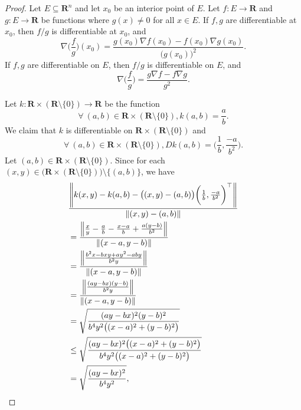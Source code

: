 \begin{proof}
    Let \(E \subseteq \mathbf{R}^n\) and let \(x_0\) be an interior point of \(E\).
    Let \(f : E \to \mathbf{R}\) and \(g : E \to \mathbf{R}\) be functions where \(g(x) \neq 0\) for all \(x \in E\).
    If \(f, g\) are differentiable at \(x_0\), then \(f / g\) is differentiable at \(x_0\), and
    \[
        \nabla \bigg(\frac{f}{g}\bigg)(x_0) = \frac{g(x_0) \nabla f(x_0) - f(x_0) \nabla g(x_0)}{\big(g(x_0)\big)^2}.
    \]
    If \(f, g\) are differentiable on \(E\), then \(f / g\) is differentiable on \(E\), and
    \[
        \nabla \bigg(\frac{f}{g}\bigg) = \frac{g \nabla f - f \nabla g}{g^2}.
    \]

    Let \(k : \mathbf{R} \times (\mathbf{R} \setminus \{0\}) \to \mathbf{R}\) be the function
    \[
        \forall\ (a, b) \in \mathbf{R} \times (\mathbf{R} \setminus \{0\}), k(a, b) = \frac{a}{b}.
    \]
    We claim that \(k\) is differentiable on \(\mathbf{R} \times (\mathbf{R} \setminus \{0\})\) and
    \[
        \forall\ (a, b) \in \mathbf{R} \times (\mathbf{R} \setminus \{0\}), D k(a, b) = \bigg(\frac{1}{b}, \frac{-a}{b^2}\bigg).
    \]
    Let \((a, b) \in \mathbf{R} \times (\mathbf{R} \setminus \{0\})\).
    Since for each \((x, y) \in \big(\mathbf{R} \times (\mathbf{R} \setminus \{0\})\big) \setminus \{(a, b)\}\), we have
    \begin{align*}
         & \frac{\norm*{k(x, y) - k(a, b) - \big((x, y) - (a, b)\big) \bigg(\frac{1}{b}, \frac{-a}{b^2}\bigg)^\top}}{\norm*{(x, y) - (a, b)}} \\
         & = \frac{\norm*{\frac{x}{y} - \frac{a}{b} - \frac{x - a}{b} + \frac{a(y - b)}{b^2}}}{\norm*{(x - a, y - b)}}                        \\
         & = \frac{\norm*{\frac{b^2 x - bxy + ay^2 - aby}{b^2y}}}{\norm*{(x - a, y - b)}}                                                     \\
         & = \frac{\norm*{\frac{(ay - bx)(y - b)}{b^2y}}}{\norm*{(x - a, y - b)}}                                                             \\
         & = \sqrt{\frac{(ay - bx)^2 (y - b)^2}{b^4 y^2 \big((x - a)^2 + (y - b)^2\big)}}                                                     \\
         & \leq \sqrt{\frac{(ay - bx)^2 \big((x - a)^2 + (y - b)^2\big)}{b^4 y^2 \big((x - a)^2 + (y - b)^2\big)}}                            \\
         & = \sqrt{\frac{(ay - bx)^2}{b^4 y^2}},
    \end{align*}

\end{proof}
